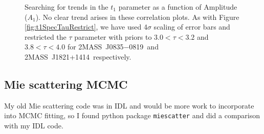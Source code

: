 \documentclass[manuscript]{aastex6}
\newcommand{\sha}{2MASS~J0835$-$0819}
\newcommand{\shb}{2MASS~J1821+1414}
\begin{document}
\begin{figure}[!t]
\centering
{}
	\caption{Searching for trends in the $t_1$ parameter as a function of Amplitude ($A_1$). No clear trend arises in these correlation plots. As with Figure \ref{fig:t1SpecTauRestrict}, we have used 4$\sigma$ scaling of error bars and restricted the $\tau$ parameter with priors to $3.0 < \tau < 3.2$ and $3.8 < \tau < 4.0$ for \sha\ and \shb\ respectively.}
	\label{fig:t1vsA1SpecTest}
	\vspace{0.1in}
\end{figure} 


\clearpage
\pagebreak
\subsection{Mie scattering MCMC}

My old Mie scattering code was in IDL and would be more work to incorporate into MCMC fitting, so I found python package \texttt{miescatter} and did a comparison with my IDL code.
\end{document}
